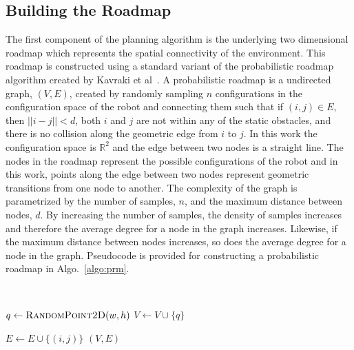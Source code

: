 \subsection{Building the Roadmap}

The first component of the planning algorithm is the underlying two dimensional
roadmap which represents the spatial connectivity of the environment. This
roadmap is constructed using a standard variant of the probabilistic roadmap
algorithm created by Kavraki et al~\cite{prm}. A probabilistic roadmap is a
undirected graph, $(V, E)$, created by randomly sampling $n$ configurations in
the configuration space of the robot and connecting them such that if $(i, j)
\in E$, then $||i - j|| < d$, both $i$ and $j$ are not within any of the static
obstacles, and there is no collision along the geometric edge from $i$ to $j$.
In this work the configuration space is $\mathbb{R}^2$ and the edge between two
nodes is a straight line. The nodes in the roadmap represent the possible
configurations of the robot and in this work, points along the edge between two
nodes represent geometric transitions from one node to another. The complexity
of the graph is parametrized by the number of samples, $n$, and the maximum
distance between nodes, $d$. By increasing the number of samples, the density
of samples increases and therefore the average degree for a node in the graph
increases.  Likewise, if the maximum distance between nodes increases, so does
the average degree for a node in the graph.  Pseudocode is provided for
constructing a probabilistic roadmap in Algo.~\ref{algo:prm}.

\begin{algorithm}[ht]
    \caption{$\Function{Roadmap}(n, d, w, h, O)$}
    \\
    \label{algo:prm}
    \begin{algorithmic}[1]
        \setcounter{ALC@line}{0}
        \vspace*{1mm}

            \STATE $q \leftarrow \Function{RandomPoint2D}(w, h)$
                \STATE $V \leftarrow V \cup \{q\}$
            \ENDIF
        \ENDFOR

                    \STATE $E \leftarrow E \cup \{(i, j)\}$
                \ENDIF
            \ENDFOR
        \ENDFOR
        \RETURN $(V,E)$
    \end{algorithmic}
\end{algorithm}

